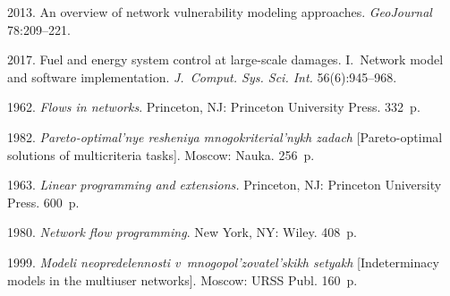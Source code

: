






  \begin{multicols}{2}

\renewcommand{\bibname}{\protect\rmfamily References}

{\small\frenchspacing
 {%
 \begin{thebibliography}{9}
 2013. An overview of network vulnerability modeling approaches. 
\textit{GeoJournal} 78:209--221.

2017. Fuel and energy system control at large-scale damages. I.~Network model 
and software implementation. \textit{J.~Comput. Sys. Sci. Int.}
56(6):945--968. 

1962. \textit{Flows in networks}. Princeton, NJ: Princeton University Press. 332~p.

1982. \textit{Pareto-optimal'nye resheniya mnogokriterial'nykh zadach} 
[Pareto-optimal solutions of multicriteria tasks]. Moscow: Nauka. 256~p. 

 1963.  
\textit{Linear programming and extensions.} 
Princeton, NJ: Princeton University Press. 600~p.



1980. \textit{Network flow programming}. New York, NY: Wiley. 408~p. 

1999. \textit{Modeli neopredelennosti v~mnogopol'zovatel'skikh setyakh} 
[Indeterminacy models in the multiuser networks].  Moscow: URSS Publ. 160~p.
\end{thebibliography}

 }
 }

\end{multicols}

